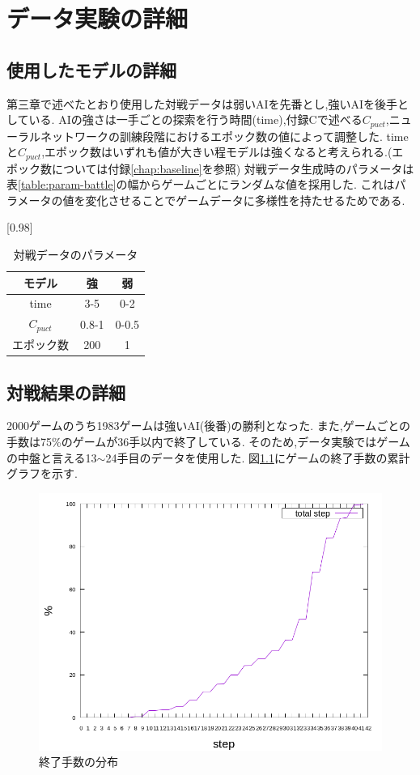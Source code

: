 \chapter{データ実験の詳細}
\label{chap:data}
\section{使用したモデルの詳細}
第三章で述べたとおり使用した対戦データは弱いAIを先番とし,強いAIを後手としている.
AIの強さは一手ごとの探索を行う時間(time),付録Cで述べる$C_{puct}$,ニューラルネットワークの訓練段階におけるエポック数の値によって調整した.
timeと$C_{puct}$,エポック数はいずれも値が大きい程モデルは強くなると考えられる.(エポック数については付録\ref{chap:baseline}を参照)
対戦データ生成時のパラメータは表\ref{table:param-battle}の幅からゲームごとにランダムな値を採用した.
これはパラメータの値を変化させることでゲームデータに多様性を持たせるためである.
\begin{table}[H]
	\caption{対戦データのパラメータ}
	\label{table:param-battle}
	\centering
	\scalebox{0.98}[0.98]{
		\begin{tabular}{c|c|c}
			モデル&強&弱\\ \hline
			time    & 3-5 & 0-2 \\ 
			$C_{puct}$ & 0.8-1   & 0-0.5 \\
			エポック数 & 200 & 1 \\

		\end{tabular}
	}
	\label{table:battle}
\end{table}

\section{対戦結果の詳細}
2000ゲームのうち1983ゲームは強いAI(後番)の勝利となった.
また,ゲームごとの手数は75\%のゲームが36手以内で終了している.
そのため,データ実験ではゲームの中盤と言える13$\sim$24手目のデータを使用した.
図\ref{fig:stepCum}にゲームの終了手数の累計グラフを示す.
\begin{figure}[t]
	\centering
	\includegraphics[width=\linewidth]{./figure/stepCum.png}
	\caption{終了手数の分布}
	\label{fig:stepCum}
\end{figure}
